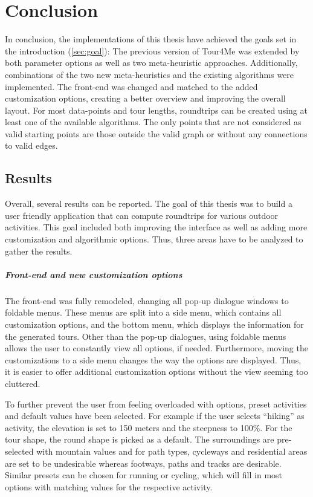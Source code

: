 \chapter{Conclusion}
\label{chapter:conclusion}

In conclusion, the implementations of this thesis have achieved the goals set in the introduction (\ref{sec:goal}):
The previous version of Tour4Me was extended by both parameter options as well as two meta-heuristic approaches. 
Additionally, combinations of the two new meta-heuristics and the existing algorithms were implemented.
The front-end was changed and matched to the added customization options, creating a better overview and improving the overall layout.
For most data-points and tour lengths, roundtrips can be created using at least one of the available algorithms. 
The only points that are not considered as valid starting points are those outside the valid graph or without any connections to valid edges.

\section{Results}
\label{sec:results}

Overall, several results can be reported.
The goal of this thesis was to build a user friendly application that can compute roundtrips for various outdoor activities.
This goal included both improving the interface as well as adding more customization and algorithmic options.
Thus, three areas have to be analyzed to gather the results.

\paragraph{Front-end and new customization options}

The front-end was fully remodeled, changing all pop-up dialogue windows to foldable menus.
These menus are split into a side menu, which contains all customization options, and the bottom menu, which displays the information for the generated tours. 
Other than the pop-up dialogues, using foldable menus allows the user to constantly view all options, if needed.
Furthermore, moving the customizations to a side menu changes the way the options are displayed. 
Thus, it is easier to offer additional customization options without the view seeming too cluttered.

To further prevent the user from feeling overloaded with options, preset activities and default values have been selected.
For example if the user selects \enquote{hiking} as activity, the elevation is set to 150 meters and the steepness to 100\%.
For the tour shape, the round shape is picked as a default.
The surroundings are pre-selected with mountain values and for path types, cycleways and residential areas are set to be undesirable whereas footways, paths and tracks are desirable.
Similar presets can be chosen for running or cycling, which will fill in most options with matching values for the respective activity.

